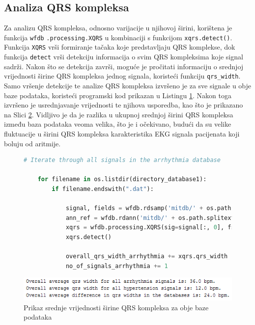 \documentclass[12pt,a4paper]{article}
\begin{document}
\subsection{Analiza QRS kompleksa}

\quad Za analizu QRS kompleksa, odnosno varijacije u njihovoj širini, korištena je funkcija \texttt{wfdb} \texttt{.processing.XQRS} u kombinaciji s funkcijom \texttt{xqrs.detect()}. Funkcija \texttt{XQRS} vrši formiranje tačaka koje predstavljaju QRS komplekse, dok funkcija \texttt{detect} vrši detekciju informacija o svim QRS kompleksima koje signal sadrži. Nakon što se detekcija završi, moguće je pročitati informaciju o srednjoj vrijednosti širine QRS kompleksa jednog signala, koristeći funkciju \texttt{qrs\_width}. \\

Samo vršenje detekcije te analize QRS kompleksa izvršeno je za sve signale u obje baze podataka, koristeći programski kod prikazan u Listingu \ref{qrslst}. Nakon toga izvršeno je usrednjavanje vrijednosti te njihova usporedba, kao što je prikazano na Slici \ref{qrs}. Vidljivo je da je razlika u ukupnoj srednjoj širini QRS kompleksa između baza podataka veoma velika, što je i očekivano, budući da su velike fluktuacije u širini QRS kompleksa karakteristika EKG signala pacijenata koji boluju od aritmije.

\begin{figure}[H]
\label{qrslst}
\begin{lstlisting}[language=python]
    # Iterate through all signals in the arrhythmia database

    for filename in os.listdir(directory_database1):
        if filename.endswith(".dat"):

            signal, fields = wfdb.rdsamp('mitdb/' + os.path.splitext(filename)[0], channels=[0], sampfrom=100000, sampto=104000)
            ann_ref = wfdb.rdann('mitdb/' + os.path.splitext(filename)[0], 'atr')
            xqrs = wfdb.processing.XQRS(sig=signal[:, 0], fs=fields['fs'])
            xqrs.detect()

            overall_qrs_width_arrhythmia += xqrs.qrs_width
            no_of_signals_arrhythmia += 1
\end{lstlisting}
\end{figure}

\begin{figure}[H]
\center
\includegraphics[scale=0.75]{../res/qrs-width.PNG}
\caption{Prikaz srednje vrijednosti širine QRS kompleksa za obje baze podataka}
\label{qrs}
\end{figure}
\end{document}
